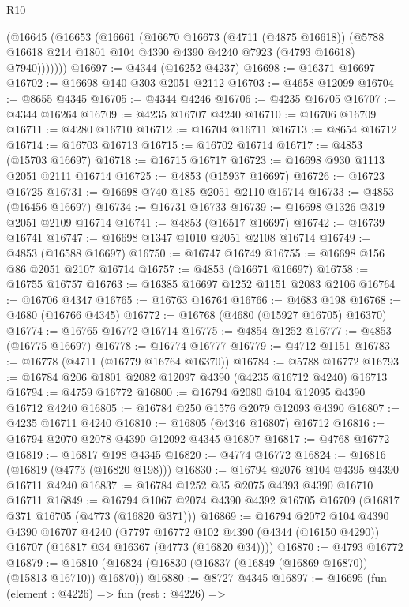 \begin{lexlean}{R10}
\begin{coremodule}
        (@16645
          (@16653
            (@16661
              (@16670
                @16673
                (@4711 (@4875 @16618))
                (@5788 @16618 @214 @1801 @104 @4390 @4390 @4240 @7923 (@4793 @16618) @7940)))))))
@16697 := @4344 (@16252 @4237)
@16698 := @16371 @16697
@16702 := @16698 @140 @303 @2051 @2112
@16703 := @4658 @12099
@16704 := @8655 @4345
@16705 := @4344 @4246
@16706 := @4235 @16705
@16707 := @4344 @16264
@16709 := @4235 @16707 @4240
@16710 := @16706 @16709
@16711 := @4280 @16710
@16712 := @16704 @16711
@16713 := @8654 @16712
@16714 := @16703 @16713
@16715 := @16702 @16714
@16717 := @4853 (@15703 @16697)
@16718 := @16715 @16717
@16723 := @16698 @930 @1113 @2051 @2111 @16714
@16725 := @4853 (@15937 @16697)
@16726 := @16723 @16725
@16731 := @16698 @740 @185 @2051 @2110 @16714
@16733 := @4853 (@16456 @16697)
@16734 := @16731 @16733
@16739 := @16698 @1326 @319 @2051 @2109 @16714
@16741 := @4853 (@16517 @16697)
@16742 := @16739 @16741
@16747 := @16698 @1347 @1010 @2051 @2108 @16714
@16749 := @4853 (@16588 @16697)
@16750 := @16747 @16749
@16755 := @16698 @156 @86 @2051 @2107 @16714
@16757 := @4853 (@16671 @16697)
@16758 := @16755 @16757
@16763 := @16385 @16697 @1252 @1151 @2083 @2106
@16764 := @16706 @4347
@16765 := @16763 @16764
@16766 := @4683 @198
@16768 := @4680 (@16766 @4345)
@16772 := @16768 (@4680 (@15927 @16705) @16370)
@16774 := @16765 @16772 @16714
@16775 := @4854 @1252
@16777 := @4853 (@16775 @16697)
@16778 := @16774 @16777
@16779 := @4712 @1151
@16783 := @16778 (@4711 (@16779 @16764 @16370))
@16784 := @5788 @16772
@16793 := @16784 @206 @1801 @2082 @12097 @4390 (@4235 @16712 @4240) @16713
@16794 := @4759 @16772
@16800 := @16794 @2080 @104 @12095 @4390 @16712 @4240
@16805 := @16784 @250 @1576 @2079 @12093 @4390
@16807 := @4235 @16711 @4240
@16810 := @16805 (@4346 @16807) @16712
@16816 := @16794 @2070 @2078 @4390 @12092 @4345 @16807
@16817 := @4768 @16772
@16819 := @16817 @198 @4345
@16820 := @4774 @16772
@16824 := @16816 (@16819 (@4773 (@16820 @198)))
@16830 := @16794 @2076 @104 @4395 @4390 @16711 @4240
@16837 := @16784 @1252 @35 @2075 @4393 @4390 @16710 @16711
@16849 := @16794 @1067 @2074 @4390 @4392 @16705 @16709 (@16817 @371 @16705 (@4773 (@16820 @371)))
@16869 := @16794
    @2072
    @104
    @4390
    @4390
    @16707
    @4240
    (@7797 @16772 @102 @4390 (@4344 (@16150 @4290)) @16707 (@16817 @34 @16367 (@4773 (@16820 @34))))
@16870 := @4793 @16772
@16879 := @16810 (@16824 (@16830 (@16837 (@16849 (@16869 @16870)) (@15813 @16710)) @16870))
@16880 := @8727 @4345
@16897 := @16695
    (fun (element : @4226) =>
    fun (rest : @4226) =>

\end{coremodule}
\end{lexlean}
